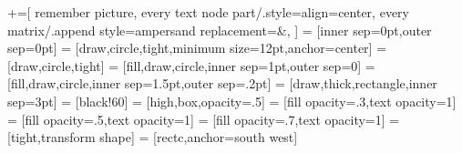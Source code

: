 \makeatletter
{}
\makeatother

\usepackage[dvipsnames,svgnames,x11names]{xcolor}
\usepackage{tikz}
\usetikzlibrary{arrows.meta,shapes,calc,matrix,fit,positioning,backgrounds,decorations.markings,fadings}
\usepackage{pgfplots}
\usepackage{pgfplotstable}
\pgfplotsset{compat=1.9}
\usepackage{xstring}


\newcommand{\extfig}[2]{\tikzsetnextfilename{#1}{#2}}
\newcommand{\noextfig}[1]{\tikzset{external/export next={false}}{#1}}
\newcommand{\extdata}[1]{}


+=[
	remember picture,
	every text node part/.style={align=center},
	every matrix/.append style={ampersand replacement=\&},
]
 = [inner sep=0pt,outer sep=0pt]
  = [draw,circle,tight,minimum size=12pt,anchor=center]
    = [draw,circle,tight]
   = [fill,draw,circle,inner sep=1pt,outer sep=0]
    = [fill,draw,circle,inner sep=1.5pt,outer sep=.2pt]
   = [draw,thick,rectangle,inner sep=3pt]
  = [black!60]
 = [high,box,opacity=.5]
  = [fill opacity=.3,text opacity=1]
  = [fill opacity=.5,text opacity=1]
  = [fill opacity=.7,text opacity=1]
 = [tight,transform shape]
  = [rectc,anchor=south west]


\newcommand{\framed}[3][1]{\extfig{#2}{\tikz{
	\node[tight](a){\fig[#1]{#3}};
	\node[tight,draw=gray,fit=(a)]{};
}}}


\newcommand{\leg}[1]{\addlegendentry{#1}}

